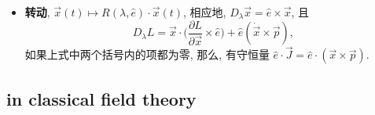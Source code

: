 \begin{itemize}
\begin{itemize}
		\item \textbf{转动}, $\vec{x}(t) \mapsto R(\lambda, \hat{e}) \cdot \vec{x}(t)$, 相应地, $D_\lambda \vec{x} = \hat{e} \times \vec{x}$, 且
		\begin{equation}
			D_\lambda L = \vec{x} \cdot \Big( \frac{\partial L}{\partial \vec{x}} \times \hat{e} \Big) + \hat{e} (\dot{\vec{x}} \times \vec{p}),
		\end{equation}
		如果上式中两个括号内的项都为零, 那么, 有守恒量 $\hat{e} \cdot \vec{J} = \hat{e} \cdot (\vec{x} \times \vec{p})$.
	\end{itemize}
\end{itemize}

\subsection{in classical field theory}
